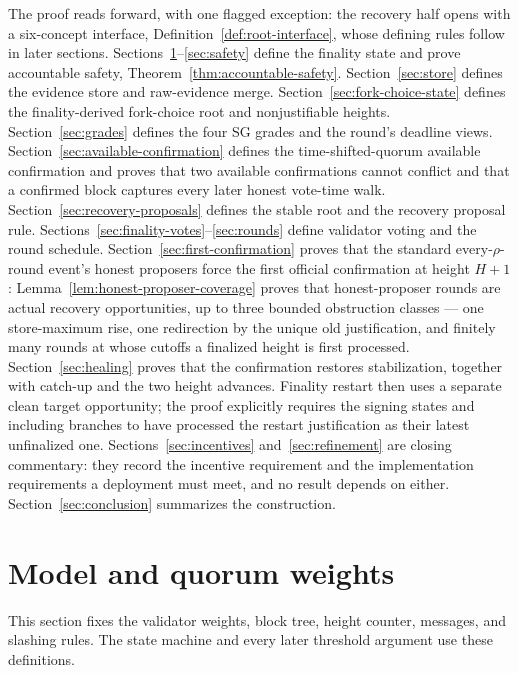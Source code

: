 \ifx\litemode\undefined\documentclass{article}\fi
\theoremstyle{plain}
\theoremstyle{definition}
\theoremstyle{remark}
\begin{document}
The proof reads forward, with one flagged exception: the recovery half
opens with a six-concept interface, Definition~\ref{def:root-interface},
whose defining rules follow in later sections.
Sections~\ref{sec:model}--\ref{sec:safety} define the
finality state and prove accountable safety,
Theorem~\ref{thm:accountable-safety}.  Section~\ref{sec:store} defines
the evidence store and raw-evidence merge.  Section~\ref{sec:fork-choice-state}
defines the finality-derived fork-choice root and nonjustifiable heights.
Section~\ref{sec:grades} defines the four SG grades and the round's
deadline views.  Section~\ref{sec:available-confirmation} defines the
time-shifted-quorum available confirmation and proves that two available
confirmations cannot conflict and that a confirmed block captures every later
honest vote-time walk.  Section~\ref{sec:recovery-proposals} defines the
stable root and the recovery proposal rule.
Sections~\ref{sec:finality-votes}--\ref{sec:rounds} define validator voting
and the round schedule.
Section~\ref{sec:first-confirmation} proves that the standard
every-\(\rho\)-round event's honest proposers force the first
official confirmation at height \(H+1\):
Lemma~\ref{lem:honest-proposer-coverage} proves that honest-proposer
rounds are actual recovery opportunities, up to three bounded
obstruction classes --- one store-maximum rise, one redirection by the
unique old justification, and finitely many rounds at whose cutoffs a
finalized height is first processed.
Section~\ref{sec:healing} proves that the confirmation restores
stabilization, together with catch-up and the two height advances.
Finality restart then uses a separate clean target opportunity; the proof
explicitly requires the signing states and including branches to have
processed the restart justification as their latest unfinalized one.
Sections~\ref{sec:incentives} and~\ref{sec:refinement} are closing commentary:
they record the incentive requirement and the implementation requirements a
deployment must meet, and no result depends on either.
Section~\ref{sec:conclusion} summarizes the construction.

\section{Model and quorum weights}\label{sec:model}

This section fixes the validator weights, block tree, height counter, messages,
and slashing rules.  The state machine and every later threshold argument use
these definitions.
\end{document}
